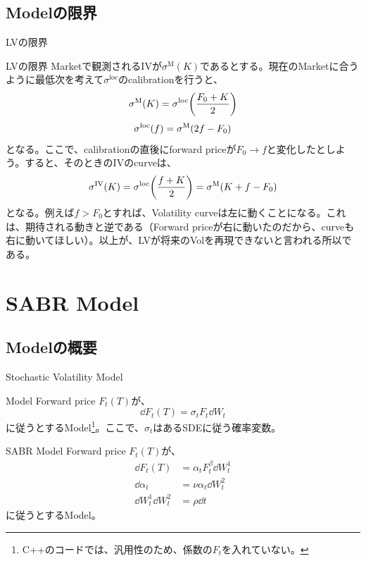 \documentclass[dvipdfmx,9pt]{beamer}
\begin{document}
\subsection{Modelの限界}
\begin{frame}{LVの限界}
  \begin{block}{LVの限界}
    Marketで観測されるIVが$\sigma^{\mathrm{M}}(K)$であるとする。現在のMarketに合うように最低次を考えて$\sigma^{\mathrm{loc}}$のcalibrationを行うと、
    \begin{equation}
      \sigma^{\mathrm{M}}(K) = \sigma^{\mathrm{loc}}\pqty{\frac{F_{0}+K}{2}}
    \end{equation}
    \begin{equation}
      \sigma^{\mathrm{loc}}\pqty{f} = \sigma^{\mathrm{M}}(2f - F_{0})
    \end{equation}
    となる。ここで、calibrationの直後にforward priceが$F_{0} \to f$と変化したとしよう。すると、そのときのIVのcurveは、
    \begin{equation}
      \sigma^{\mathrm{IV}}(K) = \sigma^{\mathrm{loc}}\pqty{\frac{f+K}{2}} = \sigma^{\mathrm{M}}(K+f-F_{0})
    \end{equation}
    となる。例えば$f>F_{0}$とすれば、Volatility curveは左に動くことになる。これは、期待される動きと逆である（Forward priceが右に動いたのだから、curveも右に動いてほしい）。以上が、LVが将来のVolを再現できないと言われる所以である。
  \end{block}
\end{frame}

\section{SABR Model}
\subsection{Modelの概要}
\begin{frame}{Stochastic Volatility Model}
  \begin{block}{Model}
    Forward price $F_{t}(T)$が、
    \begin{equation}
      \dd F_{t}(T) = \sigma_{t} F_{t} \dd W_{t}
    \end{equation}
    に従うとするModel\footnote{C++のコードでは、汎用性のため、係数の$F_{t}$を入れていない。}。ここで、$\sigma_{t}$はあるSDEに従う確率変数。
  \end{block}
  \begin{block}{SABR Model}
    Forward price $F_{t}(T)$が、
    \begin{align}
      \dd F_{t}(T)                & = \alpha_{t} F_{t}^{\beta} \dd W_{t}^{1} \\
      \dd \alpha_{t}              & = \nu \alpha_{t} \dd W_{t}^{2}           \\
      \dd W_{t}^{1} \dd W_{t}^{2} & = \rho \dd t
    \end{align}
    に従うとするModel。
  \end{block}
\end{frame}
\end{document}
